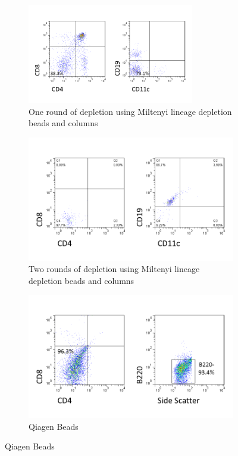 \begin{figure}
	\begin{subfigure}{\textwidth}
	\includegraphics[width=0.8\textwidth]{Figures/1rounddepletion.png}
	\caption{One round of depletion using Miltenyi lineage depletion beads and columns}
	\label{subfig:1rounddep}
	\end{subfigure}
	\hfill
	\begin{subfigure}{0.8\textwidth}
	\includegraphics[width=\textwidth]{Figures/2rounddepletion.png}
	\caption{Two rounds of depletion using Miltenyi lineage depletion beads and columns}
	\label{subfig:2rounddep}
	\end{subfigure}
	\hfill
	\begin{subfigure}{0.8\textwidth}
	\includegraphics[width=\textwidth] {Figures/Qiagenbeads.png}
	\caption{Qiagen Beads}
	\label{subfig:Qiagen}
	\end{subfigure}
	

\end{figure}
